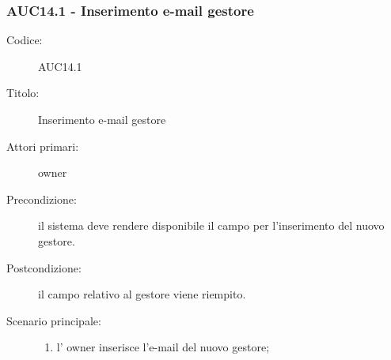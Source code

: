 \documentclass[casi-duso]{subfiles}
\begin{document}
\subsubsection{AUC14.1 - Inserimento e-mail gestore}%
\label{subsub:AUC14.1}
\begin{description}
  \item[Codice:] AUC14.1
  \item[Titolo:] Inserimento e-mail gestore
  \item[Attori primari:] owner
  \item[Precondizione:] il sistema deve rendere disponibile il campo per l'inserimento del nuovo gestore.
  \item[Postcondizione:] il campo relativo al gestore viene riempito.
  \item[Scenario principale:] 
  \begin{enumerate}
    \item l' owner inserisce l'e-mail del nuovo gestore;
  \end{enumerate}
\end{description}

\end{document}
